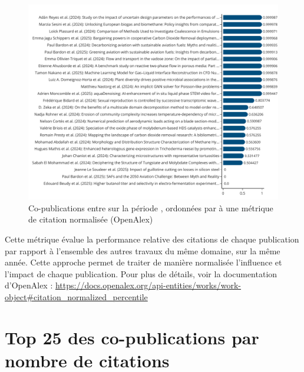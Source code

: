 \documentclass[french, 11pt]{dibiso/pubpart}
\begin{document}
\begin{figure}[!h]
  \includegraphics[width=\textwidth]{figures/works_collaborations_citationsnormalized.pdf}
  \caption{Co-publications entre \entitiesacronym sur la période \reportyear, ordonnées par à une métrique de citation normalisée (OpenAlex)}
  \label{fig_works_collaborations_citationsnormalized}
\end{figure}

{\footnotesize\workscollaborationscitationsnormalizedinfo}

Cette métrique évalue la performance relative des citations de chaque publication par rapport à l'ensemble des autres travaux du même domaine, sur la même année. Cette approche permet de traiter de manière normalisée l'influence et l'impact de chaque publication. Pour plus de détails, voir la documentation d'OpenAlex : \url{https://docs.openalex.org/api-entities/works/work-object#citation_normalized_percentile}

\bigskip








\pagebreak

\section{Top 25 des co-publications par nombre de citations}
\end{document}
